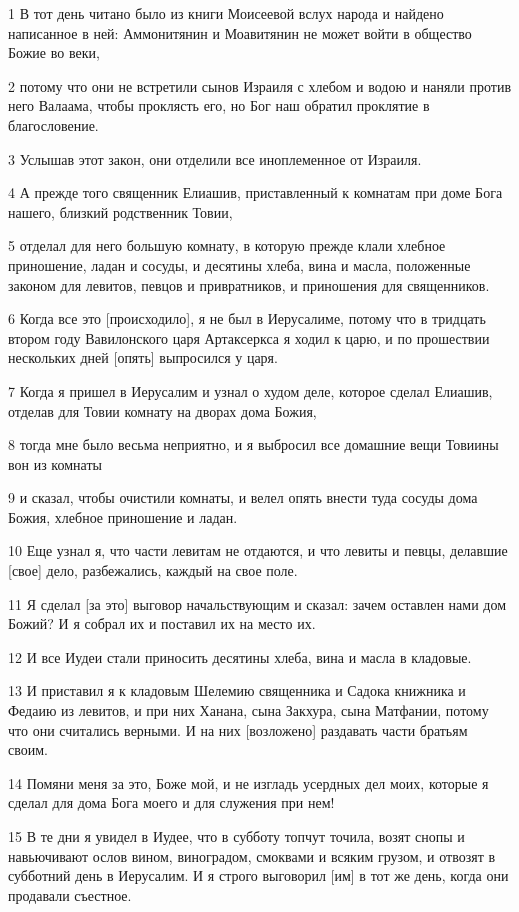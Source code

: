 \par 1 В тот день читано было из книги Моисеевой вслух народа и найдено написанное в ней: Аммонитянин и Моавитянин не может войти в общество Божие во веки,
\par 2 потому что они не встретили сынов Израиля с хлебом и водою и наняли против него Валаама, чтобы проклясть его, но Бог наш обратил проклятие в благословение.
\par 3 Услышав этот закон, они отделили все иноплеменное от Израиля.
\par 4 А прежде того священник Елиашив, приставленный к комнатам при доме Бога нашего, близкий родственник Товии,
\par 5 отделал для него большую комнату, в которую прежде клали хлебное приношение, ладан и сосуды, и десятины хлеба, вина и масла, положенные законом для левитов, певцов и привратников, и приношения для священников.
\par 6 Когда все это [происходило], я не был в Иерусалиме, потому что в тридцать втором году Вавилонского царя Артаксеркса я ходил к царю, и по прошествии нескольких дней [опять] выпросился у царя.
\par 7 Когда я пришел в Иерусалим и узнал о худом деле, которое сделал Елиашив, отделав для Товии комнату на дворах дома Божия,
\par 8 тогда мне было весьма неприятно, и я выбросил все домашние вещи Товиины вон из комнаты
\par 9 и сказал, чтобы очистили комнаты, и велел опять внести туда сосуды дома Божия, хлебное приношение и ладан.
\par 10 Еще узнал я, что части левитам не отдаются, и что левиты и певцы, делавшие [свое] дело, разбежались, каждый на свое поле.
\par 11 Я сделал [за это] выговор начальствующим и сказал: зачем оставлен нами дом Божий? И я собрал их и поставил их на место их.
\par 12 И все Иудеи стали приносить десятины хлеба, вина и масла в кладовые.
\par 13 И приставил я к кладовым Шелемию священника и Садока книжника и Федаию из левитов, и при них Ханана, сына Закхура, сына Матфании, потому что они считались верными. И на них [возложено] раздавать части братьям своим.
\par 14 Помяни меня за это, Боже мой, и не изгладь усердных дел моих, которые я сделал для дома Бога моего и для служения при нем!
\par 15 В те дни я увидел в Иудее, что в субботу топчут точила, возят снопы и навьючивают ослов вином, виноградом, смоквами и всяким грузом, и отвозят в субботний день в Иерусалим. И я строго выговорил [им] в тот же день, когда они продавали съестное.
